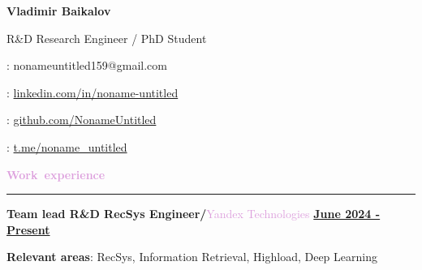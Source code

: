 \documentclass[10pt,a4paper]{report}
\author{Vladimir Baikalov}
\begin{document}
\noindent
\begin{minipage}[c]{0.66\linewidth}
\Huge{\textbf{Vladimir Baikalov}}

\small{R\&D Research Engineer / PhD Student}
\end{minipage}
\begin{minipage}[c]{0.33\linewidth}
\Letter: nonameuntitled159@gmail.com

\faLinkedin : \href{https://www.linkedin.com/in/noname-untitled}{linkedin.com/in/noname-untitled}

\faGithub:  \href{http://www.github.com/NonameUntitled}{github.com/NonameUntitled}

\faSend:  \href{http://www.t.me/noname\_untitled}{t.me/noname\_untitled}

\end{minipage}

\par\hbox{\Large{\textcolor{Plum}{\textbf{Work experience}}}}\kern3pt\hrule\kern5pt

\textbf{\large{Team lead R\&D RecSys Engineer/}}\textcolor{Plum}{Yandex Technologies}
\hfill
\textbf {\underline{June 2024 - Present}}

\textbf{Relevant areas}: RecSys, Information Retrieval, Highload, Deep Learning
\end{document}
